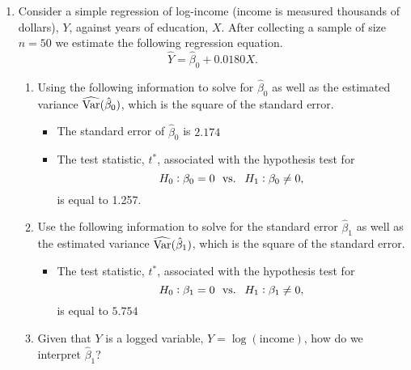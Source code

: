 \documentclass[10pt]{article}
\begin{document}
\begin{enumerate}
\begin{enumerate}
		 
	\end{enumerate}
	\item Consider a simple regression of log-income (income is measured thousands of dollars), \(Y\), against years of education,  \(X\). After collecting a sample of size \(n=50\) we estimate the following regression equation. 
	 \[
		 \widehat Y = \hat\beta_0 + 0.0180 X
	.\]
	\begin{enumerate}
		\item Using the following information to solve for \(\hat\beta_0\) as well as the estimated variance \(\widehat{\operatorname{Var}}(\hat\beta_0)\), which is the square of the standard error. 
		\begin{itemize}
			\item The standard error of \(\hat\beta_0\) is  \(2.174\)
			\item The test statistic, \(t^*\), associated with the hypothesis test for
			 \[
				 H_0:\beta_0 = 0\hbox{ }\text{ vs. }\hbox{ }H_1:\beta_0 \neq 0
			,\]
			is equal to 1.257. 
		\end{itemize}

		 	

		\item Use the following information to solve for the standard error \(\hat\beta_1\) as well as the estimated variance \(\widehat{\operatorname{Var}}(\hat\beta_1)\), which is the square of the standard error.
		\begin{itemize}
			\item The test statistic, \(t^*\), associated with the hypothesis test for
			 \[
				 H_0:\beta_1 = 0\hbox{ }\text{ vs. }\hbox{ }H_1:\beta_1 \neq 0
			,\]
			is equal to \(5.754\)
		\end{itemize}

		 
		\item Given that \(Y\) is a logged variable,  \(Y = \log(\text{income})\), how do we interpret  \(\hat\beta_1\)?



\end{enumerate}
\end{enumerate}
\end{document}
